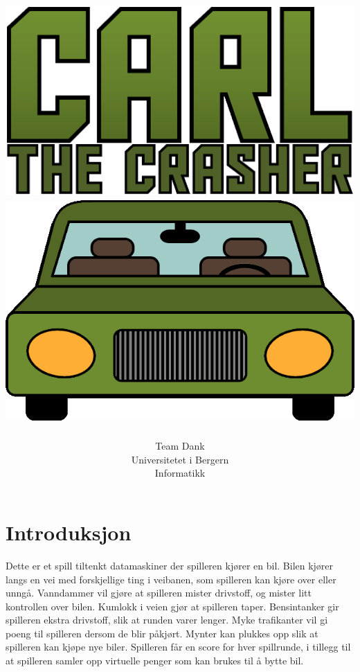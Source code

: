 \documentclass[paper=a4]{article}
\begin{document}
\title{ \normalsize \includegraphics[scale=0.43]{images/CarGameLogo.png}
	\\
	\includegraphics[scale=0.5]{images/menu_car.png}
}
\author{Team Dank \\
Universitetet i Bergern \\
Informatikk}
\maketitle
\newpage

\section{Introduksjon}
Dette er et spill tiltenkt datamaskiner der spilleren kjører en bil.
Bilen kjører langs en vei med forskjellige ting i veibanen, som spilleren kan kjøre over eller unngå.
Vanndammer vil gjøre at spilleren mister drivstoff, og mister litt kontrollen over bilen.
Kumlokk i veien gjør at spilleren taper.
Bensintanker gir spilleren ekstra drivstoff, slik at runden varer lenger.
Myke trafikanter vil gi poeng til spilleren dersom de blir påkjørt.
Mynter kan plukkes opp slik at spilleren kan kjøpe nye biler.
Spilleren får en score for hver spillrunde, i tillegg til at spilleren samler opp virtuelle penger som kan brukes til å bytte bil.
\newpage
\end{document}

